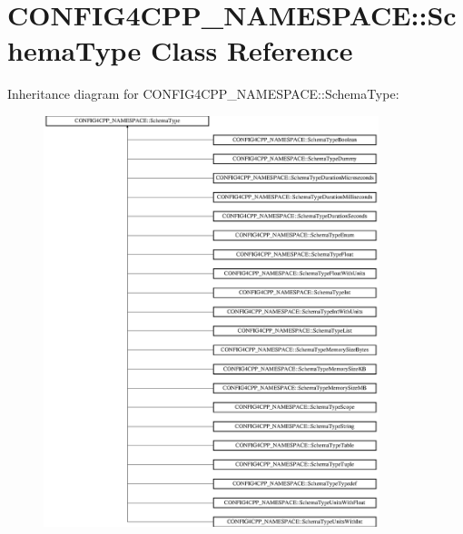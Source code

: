 \hypertarget{classCONFIG4CPP__NAMESPACE_1_1SchemaType}{\section{C\-O\-N\-F\-I\-G4\-C\-P\-P\-\_\-\-N\-A\-M\-E\-S\-P\-A\-C\-E\-:\-:Schema\-Type Class Reference}
\label{classCONFIG4CPP__NAMESPACE_1_1SchemaType}
}
Inheritance diagram for C\-O\-N\-F\-I\-G4\-C\-P\-P\-\_\-\-N\-A\-M\-E\-S\-P\-A\-C\-E\-:\-:Schema\-Type\-:\begin{figure}[H]
\begin{center}
\leavevmode
\includegraphics[height=12.000000cm]{classCONFIG4CPP__NAMESPACE_1_1SchemaType}
\end{center}
\end{figure}
